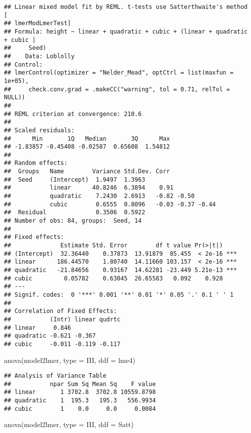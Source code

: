 \documentclass[
]{book}
\newenvironment{Shaded}{\begin{snugshade}}{\end{snugshade}}
\newcommand{\AttributeTok}[1]{\textcolor[rgb]{0.77,0.63,0.00}{#1}}
\newcommand{\FunctionTok}[1]{\textcolor[rgb]{0.00,0.00,0.00}{#1}}
\newcommand{\NormalTok}[1]{#1}
\newcommand{\StringTok}[1]{\textcolor[rgb]{0.31,0.60,0.02}{#1}}
\begin{document}
\begin{verbatim}
## Linear mixed model fit by REML. t-tests use Satterthwaite's method [
## lmerModLmerTest]
## Formula: height ~ linear + quadratic + cubic + (linear + quadratic + cubic |  
##     Seed)
##    Data: Loblolly
## Control: 
## lmerControl(optimizer = "Nelder_Mead", optCtrl = list(maxfun = 1e+05),  
##     check.conv.grad = .makeCC("warning", tol = 0.71, relTol = NULL))
## 
## REML criterion at convergence: 210.6
## 
## Scaled residuals: 
##      Min       1Q   Median       3Q      Max 
## -1.83857 -0.45408 -0.02587  0.65608  1.54812 
## 
## Random effects:
##  Groups   Name        Variance Std.Dev. Corr             
##  Seed     (Intercept)  1.9497  1.3963                    
##           linear      40.8246  6.3894    0.91            
##           quadratic    7.2430  2.6913   -0.82 -0.50      
##           cubic        0.6555  0.8096   -0.03 -0.37 -0.44
##  Residual              0.3506  0.5922                    
## Number of obs: 84, groups:  Seed, 14
## 
## Fixed effects:
##              Estimate Std. Error        df t value Pr(>|t|)    
## (Intercept)  32.36440    0.37873  13.91879  85.455  < 2e-16 ***
## linear      186.44570    1.80740  14.11660 103.157  < 2e-16 ***
## quadratic   -21.84656    0.93167  14.62281 -23.449 5.21e-13 ***
## cubic         0.05782    0.63045  26.65583   0.092    0.928    
## ---
## Signif. codes:  0 '***' 0.001 '**' 0.01 '*' 0.05 '.' 0.1 ' ' 1
## 
## Correlation of Fixed Effects:
##           (Intr) linear qudrtc
## linear     0.846              
## quadratic -0.621 -0.367       
## cubic     -0.011 -0.119 -0.117
\end{verbatim}

\begin{Shaded}
\begin{Highlighting}[]
\FunctionTok{anova}\NormalTok{(model2lmer, }\AttributeTok{type =} \StringTok{\textquotesingle{}III\textquotesingle{}}\NormalTok{, }\AttributeTok{ddf =} \StringTok{\textquotesingle{}lme4\textquotesingle{}}\NormalTok{)}
\end{Highlighting}
\end{Shaded}

\begin{verbatim}
## Analysis of Variance Table
##           npar Sum Sq Mean Sq    F value
## linear       1 3702.8  3702.8 10559.8798
## quadratic    1  195.3   195.3   556.9934
## cubic        1    0.0     0.0     0.0084
\end{verbatim}

\begin{Shaded}
\begin{Highlighting}[]
\FunctionTok{anova}\NormalTok{(model2lmer, }\AttributeTok{type =} \StringTok{\textquotesingle{}III\textquotesingle{}}\NormalTok{, }\AttributeTok{ddf =} \StringTok{\textquotesingle{}Satt\textquotesingle{}}\NormalTok{)}
\end{Highlighting}
\end{Shaded}
\end{document}
